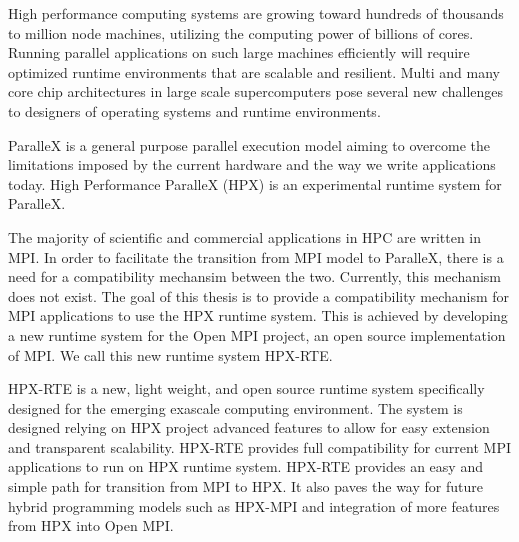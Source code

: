 High performance computing systems are growing toward hundreds of thousands to million node machines, utilizing the computing power of billions of cores. Running parallel applications on such large machines efficiently will require optimized runtime environments that are scalable and resilient. Multi and many core chip architectures in large scale supercomputers pose several new challenges to designers of operating systems and runtime environments.

ParalleX is a general purpose parallel execution model aiming to overcome the limitations imposed by the current hardware and the way we write applications today. High Performance ParalleX (HPX) is an experimental runtime system for ParalleX.

The majority of scientific and commercial applications in HPC are written in MPI. In order to facilitate the transition from MPI model to ParalleX, there is a need for a compatibility mechansim between the two. Currently, this mechanism does not exist. The goal of this thesis is to provide a compatibility mechanism for MPI applications to use the HPX runtime system. This is achieved by developing a new runtime system for the Open MPI project, an open source implementation of MPI. We call this new runtime system HPX-RTE.

HPX-RTE is a new, light weight, and open source runtime system specifically designed for the emerging exascale computing environment. The system is designed relying on HPX project advanced features to allow for easy extension and transparent scalability. HPX-RTE provides full compatibility for current MPI applications to run on HPX runtime system. HPX-RTE provides an easy and simple path for transition from MPI to HPX. It also paves the way for future hybrid programming models such as HPX-MPI and integration of more features from HPX into Open MPI.
